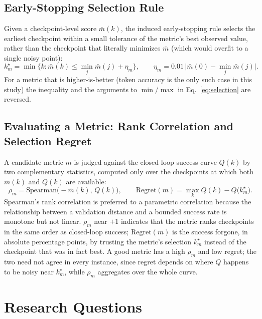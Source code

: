\documentclass[english,12pt,a4paper,pdftex,elec,utf8]{aaltothesis}
\begin{document}
\subsection{Early-Stopping Selection Rule}
\label{sec:method-selection}

Given a checkpoint-level score $\bar m(k)$, the induced early-stopping rule selects the earliest checkpoint within a small tolerance of the metric's best observed value, rather than the checkpoint that literally minimizes $\bar m$ (which would overfit to a single noisy point):
\begin{equation}
  k_m^\star = \min\Big\{k : \bar m(k) \le \min_j \bar m(j) + \eta_m\Big\}, \qquad
  \eta_m = 0.01\,\big|\bar m(0)-\min_j \bar m(j)\big|.
  \label{eq:selection}
\end{equation}
For a metric that is higher-is-better (token accuracy is the only such case in this study) the inequality and the arguments to $\min$/$\max$ in Eq.~\ref{eq:selection} are reversed.

\subsection{Evaluating a Metric: Rank Correlation and Selection Regret}
\label{sec:method-eval}

A candidate metric $m$ is judged against the closed-loop success curve $Q(k)$ by two complementary statistics, computed only over the checkpoints at which both $\bar m(k)$ and $Q(k)$ are available:
\begin{equation}
  \rho_m = \mathrm{Spearman}\big(-\bar m(k),\,Q(k)\big),
  \qquad
  \mathrm{Regret}(m) = \max_k Q(k) - Q\big(k_m^\star\big).
  \label{eq:rho-regret}
\end{equation}
Spearman's rank correlation \cite{spearman1904} is preferred to a parametric correlation because the relationship between a validation distance and a bounded success rate is monotone but not linear.
$\rho_m$ near $+1$ indicates that the metric ranks checkpoints in the same order as closed-loop success; $\mathrm{Regret}(m)$ is the success forgone, in absolute percentage points, by trusting the metric's selection $k_m^\star$ instead of the checkpoint that was in fact best. A good metric has a high $\rho_m$ and low regret; the two need not agree in every instance, since regret depends on where $Q$ happens to be noisy near $k_m^\star$, while $\rho_m$ aggregates over the whole curve.

\section{Research Questions}
\label{sec:rq}
\end{document}
